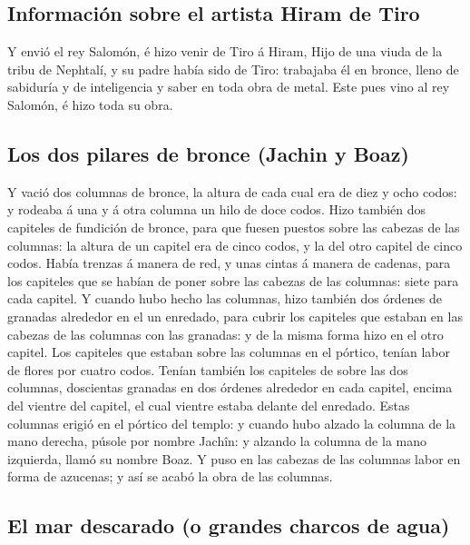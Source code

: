 \hypertarget{informaciuxf3n-sobre-el-artista-hiram-de-tiro}{%
\subsection{Información sobre el artista Hiram de
Tiro}\label{informaciuxf3n-sobre-el-artista-hiram-de-tiro}}

 Y envió el rey Salomón, é hizo venir de Tiro á Hiram,
 Hijo de una viuda de la tribu de Nephtalí, y su padre
había sido de Tiro: trabajaba él en bronce, lleno de sabiduría y de
inteligencia y saber en toda obra de metal. Este pues vino al rey
Salomón, é hizo toda su obra.

\hypertarget{los-dos-pilares-de-bronce-jachin-y-boaz}{%
\subsection{Los dos pilares de bronce (Jachin y
Boaz)}\label{los-dos-pilares-de-bronce-jachin-y-boaz}}

 Y vació dos columnas de bronce, la altura de cada cual
era de diez y ocho codos: y rodeaba á una y á otra columna un hilo de
doce codos.  Hizo también dos capiteles de fundición de
bronce, para que fuesen puestos sobre las cabezas de las columnas: la
altura de un capitel era de cinco codos, y la del otro capitel de cinco
codos.  Había trenzas á manera de red, y unas cintas á
manera de cadenas, para los capiteles que se habían de poner sobre las
cabezas de las columnas: siete para cada capitel.  Y
cuando hubo hecho las columnas, hizo también dos órdenes de granadas
alrededor en el un enredado, para cubrir los capiteles que estaban en
las cabezas de las columnas con las granadas: y de la misma forma hizo
en el otro capitel.  Los capiteles que estaban sobre las
columnas en el pórtico, tenían labor de flores por cuatro codos.
 Tenían también los capiteles de sobre las dos columnas,
doscientas granadas en dos órdenes alrededor en cada capitel, encima del
vientre del capitel, el cual vientre estaba delante del enredado.
 Estas columnas erigió en el pórtico del templo: y cuando
hubo alzado la columna de la mano derecha, púsole por nombre Jachîn: y
alzando la columna de la mano izquierda, llamó su nombre Boaz.
 Y puso en las cabezas de las columnas labor en forma de
azucenas; y así se acabó la obra de las columnas.

\hypertarget{el-mar-descarado-o-grandes-charcos-de-agua}{%
\subsection{El mar descarado (o grandes charcos de
agua)}\label{el-mar-descarado-o-grandes-charcos-de-agua}}

